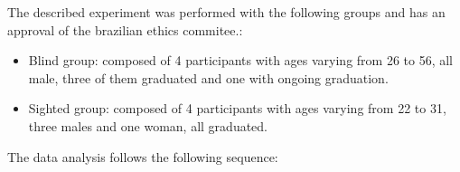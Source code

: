 

%

The described experiment was performed with the following groups and has an approval of the brazilian ethics commitee.:

\begin{itemize}
    \item Blind group: composed of 4 participants with ages varying from 26 to 56, all male, three of them graduated and one with ongoing graduation. 

    \item Sighted group: composed of 4 participants with ages varying from 22 to 31, three males and one woman, all graduated.
\end{itemize}

%
The data analysis follows the following sequence:

